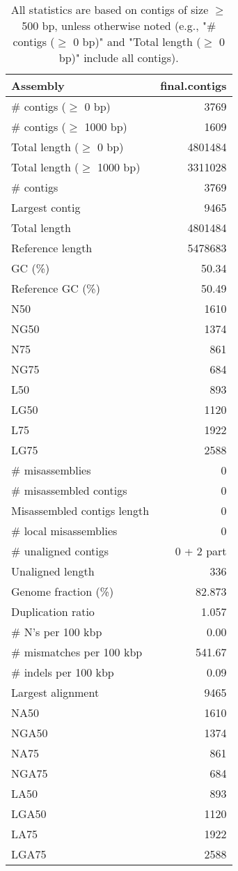 \documentclass[12pt,a4paper]{article}
\begin{document}
\begin{table}[ht]
\begin{center}
\caption{All statistics are based on contigs of size $\geq$ 500 bp, unless otherwise noted (e.g., "\# contigs ($\geq$ 0 bp)" and "Total length ($\geq$ 0 bp)" include all contigs).}
\begin{tabular}{|l*{1}{|r}|}
\hline
Assembly & final.contigs \\ \hline
\# contigs ($\geq$ 0 bp) & 3769 \\ \hline
\# contigs ($\geq$ 1000 bp) & 1609 \\ \hline
Total length ($\geq$ 0 bp) & 4801484 \\ \hline
Total length ($\geq$ 1000 bp) & 3311028 \\ \hline
\# contigs & 3769 \\ \hline
Largest contig & 9465 \\ \hline
Total length & 4801484 \\ \hline
Reference length & 5478683 \\ \hline
GC (\%) & 50.34 \\ \hline
Reference GC (\%) & 50.49 \\ \hline
N50 & 1610 \\ \hline
NG50 & 1374 \\ \hline
N75 & 861 \\ \hline
NG75 & 684 \\ \hline
L50 & 893 \\ \hline
LG50 & 1120 \\ \hline
L75 & 1922 \\ \hline
LG75 & 2588 \\ \hline
\# misassemblies & 0 \\ \hline
\# misassembled contigs & 0 \\ \hline
Misassembled contigs length & 0 \\ \hline
\# local misassemblies & 0 \\ \hline
\# unaligned contigs & 0 + 2 part \\ \hline
Unaligned length & 336 \\ \hline
Genome fraction (\%) & 82.873 \\ \hline
Duplication ratio & 1.057 \\ \hline
\# N's per 100 kbp & 0.00 \\ \hline
\# mismatches per 100 kbp & 541.67 \\ \hline
\# indels per 100 kbp & 0.09 \\ \hline
Largest alignment & 9465 \\ \hline
NA50 & 1610 \\ \hline
NGA50 & 1374 \\ \hline
NA75 & 861 \\ \hline
NGA75 & 684 \\ \hline
LA50 & 893 \\ \hline
LGA50 & 1120 \\ \hline
LA75 & 1922 \\ \hline
LGA75 & 2588 \\ \hline
\end{tabular}
\end{center}
\end{table}
\end{document}

